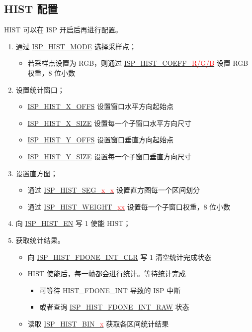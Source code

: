 \documentclass[main\_\_CN.tex]{subfiles}
\begin{document}
\subsection{HIST 配置}
HIST 可以在 ISP 开启后再进行配置。
\begin{enumerate}
    \item 通过 \hyperref[fielddesc:ISPHISTMODE]{ISP\_HIST\_MODE} 选择采样点；
    \begin{itemize}
        \item 若采样点设置为 RGB，则通过 \hyperref[fielddesc:ISPHISTCOEFFR]{ISP\_HIST\_COEFF\_\textcolor{red}{R/G/B}} 设置 RGB 权重，8 位小数
    \end{itemize}

    \item 设置统计窗口；
    \begin{itemize}
        \item \hyperref[fielddesc:ISPHISTXOFFS]{ISP\_HIST\_X\_OFFS} 设置窗口水平方向起始点
        \item \hyperref[fielddesc:ISPHISTXSIZE]{ISP\_HIST\_X\_SIZE} 设置每一个子窗口水平方向尺寸
        \item \hyperref[fielddesc:ISPHISTYOFFS]{ISP\_HIST\_Y\_OFFS} 设置窗口垂直方向起始点
        \item \hyperref[fielddesc:ISPHISTYSIZE]{ISP\_HIST\_Y\_SIZE} 设置每一个子窗口垂直方向尺寸
    \end{itemize}

    \item 设置直方图；
    \begin{itemize}
        \item 通过 \hyperref[fielddesc:ISPHISTSEG01]{ISP\_HIST\_SEG\_\textcolor{red}{x}\_\textcolor{red}{x}} 设置直方图每一个区间划分
        \item 通过 \hyperref[fielddesc:ISPHISTWEIGHT00]{ISP\_HIST\_WEIGHT\_\textcolor{red}{xx}} 设置每一个子窗口权重，8 位小数
    \end{itemize}

    \item 向 \hyperref[fielddesc:ISPHISTEN]{ISP\_HIST\_EN} 写 1 使能 HIST；

    \item 获取统计结果。
    \begin{itemize}
        \item 向 \hyperref[fielddesc:ISPHISTFDONEINTCLR]{ISP\_HIST\_FDONE\_INT\_CLR} 写 1 清空统计完成状态
        \item HIST 使能后，每一帧都会进行统计。等待统计完成
        \begin{itemize}
            \item 可等待 HIST\_FDONE\_INT 导致的 ISP 中断
            \item 或者查询 \hyperref[fielddesc:ISPHISTFDONEINTRAW]{ISP\_HIST\_FDONE\_INT\_RAW} 状态
        \end{itemize}
        \item 读取 \hyperref[fielddesc:ISPHISTBIN0]{ISP\_HIST\_BIN\_\textcolor{red}{x}} 获取各区间统计结果
    \end{itemize}
\end{enumerate}
\end{document}
